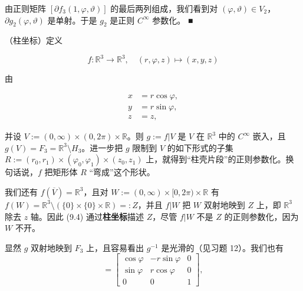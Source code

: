 \begin{example}
由正则矩阵 $ [\partial f_{3}(1, \varphi, \vartheta)] $ 的最后两列组成，我们看到对 $ (\varphi, \vartheta) \in V_{2} $，$ \partial g_{2}(\varphi, \vartheta) $ 是单射。于是 $ g_{2} $ 是正则 $ C^{\infty} $ 参数化。 \nobreak\hspace{0.35em}■

\begin{items}
\item[（c）]

（柱坐标）定义

\[
f : \mathbb{R}^{3} \to \mathbb{R}^{3} , \quad (r, \varphi, z) \mapsto (x, y, z)
\]

由

\begin{equation}
\begin{aligned}
x &= r\cos\varphi , \\ y &= r\sin\varphi , \\ z &= z ,
\end{aligned}\tag{9.4}
\end{equation}

并设 $ V := (0, \infty) \times (0, 2\pi) \times \mathbb{R} $。则 $ g := f|V $ 是 $ V $ 在 $ \mathbb{R}^{3} $ 中的 $ C^{\infty} $ 嵌入，且 $ g(V) = F_{3} = \mathbb{R}^{3} \setminus H_{3} $。进一步把 $ g $ 限制到 $ V $ 的如下形式的子集
$ R := (r_{0}, r_{1}) \times (\varphi_{0}, \varphi_{1}) \times (z_{0}, z_{1}) $ 上，就得到“柱壳片段”的正则参数化。换句话说，$ f $ 把矩形体 $ R $ “弯成”这个形状。

\end{items}


我们还有 $ f(\overline{V}) = \mathbb{R}^{3} $，且对 $ W := (0, \infty) \times [0, 2\pi) \times \mathbb{R} $ 有 $ f(W) = \mathbb{R}^{3} \setminus (\{0\} \times \{0\} \times \mathbb{R}) =: Z $，并且 $ f|W $ 把 $ W $ 双射地映到 $ Z $ 上，即 $ \mathbb{R}^{3} $ 除去 $ z $ 轴。因此 (9.4) 通过\textbf{柱坐标}描述 $ Z $，尽管 $ f|W $ 不是 $ Z $ 的正则参数化，因为 $ W $ 不开。

\proofhead
显然 $ g $ 双射地映到 $ F_{3} $ 上，且容易看出 $ g^{-1} $ 是光滑的（见习题 12）。我们也有
\begin{equation*}
[\partial f(r, \varphi, z)] = \begin{bmatrix} \cos\varphi & -r\sin\varphi & 0 \\ \sin\varphi & r\cos\varphi & 0 \\ 0 & 0 & 1 \end{bmatrix} ,
\end{equation*}


\end{example}
